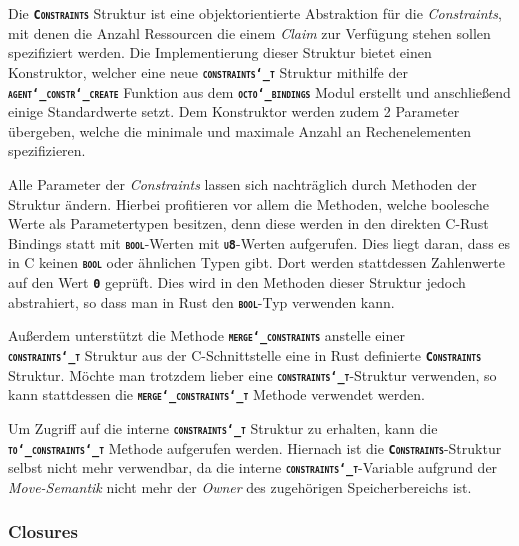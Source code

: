 Die \texttt{\textsc{\textbf{Constraints}}} Struktur ist eine
objektorientierte Abstraktion für die \textit{Constraints}, mit denen die Anzahl Ressourcen
die einem \textit{Claim} zur Verfügung stehen sollen spezifiziert werden.
Die Implementierung dieser Struktur bietet einen Konstruktor, welcher eine neue
\texttt{\textsc{\textbf{constraints\char`_t}}} Struktur mithilfe der
\texttt{\textsc{\textbf{agent\char`_constr\char`_create}}}
Funktion aus dem \texttt{\textsc{\textbf{octo\char`_bindings}}} Modul erstellt und anschließend einige Standardwerte setzt. 
Dem Konstruktor werden zudem 2 Parameter übergeben,
welche die minimale und maximale Anzahl an Rechenelementen spezifizieren.

Alle Parameter der \textit{Constraints} lassen sich nachträglich durch Methoden der Struktur ändern.
Hierbei profitieren vor allem die Methoden, welche boolesche Werte als Parametertypen besitzen,
denn diese werden in den direkten C-Rust Bindings statt mit \texttt{\textsc{\textbf{bool}}}-Werten mit
\texttt{\textsc{\textbf{u8}}}-Werten aufgerufen. Dies liegt daran, dass es in C keinen
\texttt{\textsc{\textbf{bool}}} oder ähnlichen Typen gibt. Dort werden stattdessen Zahlenwerte auf den
Wert \texttt{\textsc{\textbf{0}}} geprüft. Dies wird in den Methoden dieser Struktur jedoch abstrahiert,
so dass man in Rust den \texttt{\textsc{\textbf{bool}}}-Typ verwenden kann.

Außerdem unterstützt die Methode \texttt{\textsc{\textbf{merge\char`_constraints}}} anstelle einer \\
\texttt{\textsc{\textbf{constraints\char`_t}}} Struktur aus der C-Schnittstelle eine in Rust definierte
\texttt{\textsc{\textbf{Constraints}}} Struktur. Möchte man trotzdem lieber eine
\texttt{\textsc{\textbf{constraints\char`_t}}}-Struktur verwenden, so kann stattdessen die
\texttt{\textsc{\textbf{merge\char`_constraints\char`_t}}} Methode verwendet werden.

Um Zugriff auf die interne \texttt{\textsc{\textbf{constraints\char`_t}}} Struktur zu erhalten, kann die \\
\texttt{\textsc{\textbf{to\char`_constraints\char`_t}}} Methode aufgerufen werden.
Hiernach ist die \texttt{\textsc{\textbf{Constraints}}}-Struktur selbst nicht mehr verwendbar,
da die interne \texttt{\textsc{\textbf{constraints\char`_t}}}-Variable aufgrund der \textit{Move-Semantik}
nicht mehr der \textit{Owner} des zugehörigen Speicherbereichs ist.

\subsubsection{Closures}

